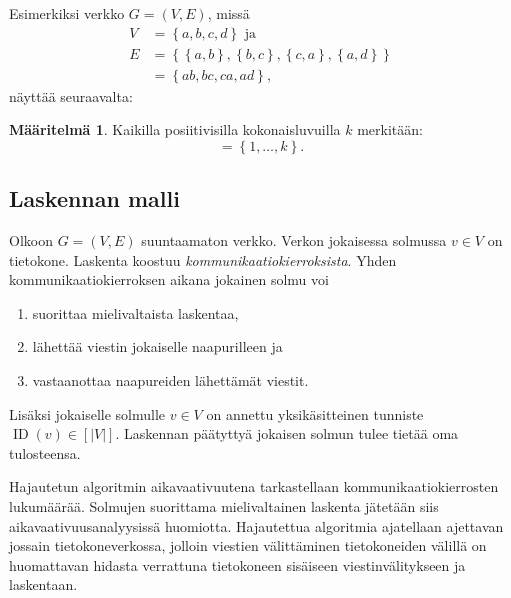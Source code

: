 \documentclass[finnish]{tktltiki2}
\theoremstyle{definition}
\newtheorem{maar}[lau]{Määritelmä}
\theoremstyle{remark}
\newcommand{\set}[1]{\left\{ #1 \right\}}
\DeclareMathOperator{\id}{ID}
\begin{document}
Esimerkiksi verkko $G = (V,E)$, missä
%
\begin{align*}
    V &= \set{a,b,c,d} \text{ ja}\\
    E &= \set{ \set{a,b}, \set{b,c}, \set{c,a}, \set{a,d}} \\
      &= \set{ab, bc, ca, ad},
\end{align*}
%
näyttää seuraavalta:
%
\begin{center}
\end{center}

\begin{maar}
    Kaikilla posiitivisilla kokonaisluvuilla $k$ merkitään:
    \begin{equation*}
        [k] = \set{1, \dots, k}.
    \end{equation*}
\end{maar}

\subsection{Laskennan malli}

Olkoon $G = (V,E)$ suuntaamaton verkko. Verkon jokaisessa solmussa $v \in V$ on
tietokone. Laskenta koostuu \emph{kommunikaatiokierroksista}. Yhden
kommunikaatiokierroksen aikana jokainen solmu voi

\begin{enumerate}
    \item suorittaa mielivaltaista laskentaa,
    \item lähettää viestin jokaiselle naapurilleen ja
    \item vastaanottaa naapureiden lähettämät viestit.
\end{enumerate}

Lisäksi jokaiselle solmulle $v \in V$ on annettu yksikäsitteinen tunniste
$\id(v) \in [|V|]$. Laskennan päätyttyä jokaisen solmun tulee
tietää oma tulosteensa.

Hajautetun algoritmin aikavaativuutena tarkastellaan kommunikaatiokierrosten
lukumäärää. Solmujen suorittama mielivaltainen laskenta jä\-te\-tään siis
aikavaativuusanalyysissä huomiotta. Hajautettua algoritmia ajatellaan ajettavan
jossain tietokoneverkossa, jolloin viestien välittäminen tietokoneiden välillä
on huomattavan hidasta verrattuna tietokoneen sisäiseen viestinvälitykseen ja
laskentaan.
\end{document}
